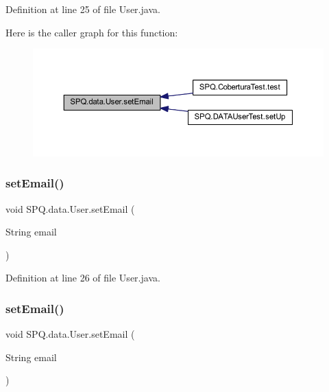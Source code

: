 Definition at line 25 of file User.\+java.

Here is the caller graph for this function\+:\nopagebreak
\begin{figure}[H]
\begin{center}
\leavevmode
\includegraphics[width=350pt]{class_s_p_q_1_1data_1_1_user_ab7132f971882fb88afc6999cf5473ef4_icgraph}
\end{center}
\end{figure}
\mbox{\label{class_s_p_q_1_1data_1_1_user_ab7132f971882fb88afc6999cf5473ef4}} 
\subsubsection{\texorpdfstring{set\+Email()}{setEmail()}\hspace{0.1cm}{\footnotesize\ttfamily [3/4]}}
{\footnotesize\ttfamily void S\+P\+Q.\+data.\+User.\+set\+Email (\begin{DoxyParamCaption}\item[{String}]{email }\end{DoxyParamCaption})}



Definition at line 26 of file User.\+java.

\mbox{\label{class_s_p_q_1_1data_1_1_user_ab7132f971882fb88afc6999cf5473ef4}} 
\subsubsection{\texorpdfstring{set\+Email()}{setEmail()}\hspace{0.1cm}{\footnotesize\ttfamily [4/4]}}
{\footnotesize\ttfamily void S\+P\+Q.\+data.\+User.\+set\+Email (\begin{DoxyParamCaption}\item[{String}]{email }\end{DoxyParamCaption})}

